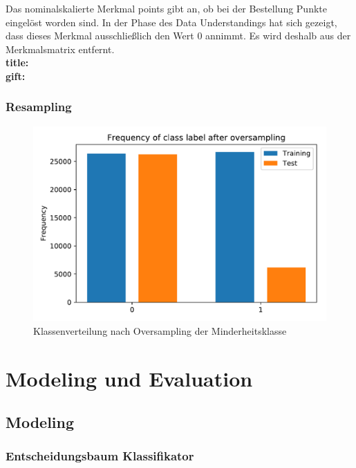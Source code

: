 Das nominalskalierte Merkmal points gibt an, ob bei der Bestellung Punkte eingelöst worden sind. In der Phase des Data Understandings hat sich gezeigt, dass dieses Merkmal ausschließlich den Wert 0 annimmt. Es wird deshalb aus der Merkmalsmatrix entfernt.\\

\textbf{title:} \\

\textbf{gift:}\\

\pagebreak

\subsection{Resampling}
\begin{figure}[!htbp]
\begin{center}
\includegraphics[scale=0.5]{pdf/oversampled.pdf}
\end{center}
\caption{Klassenverteilung nach Oversampling der Minderheitsklasse}
\label{fig:over}
\end{figure}
\FloatBarrier
\chapter{Modeling und Evaluation}
\section{Modeling}

\subsection{Entscheidungsbaum Klassifikator}
\label{sec:Tree}


